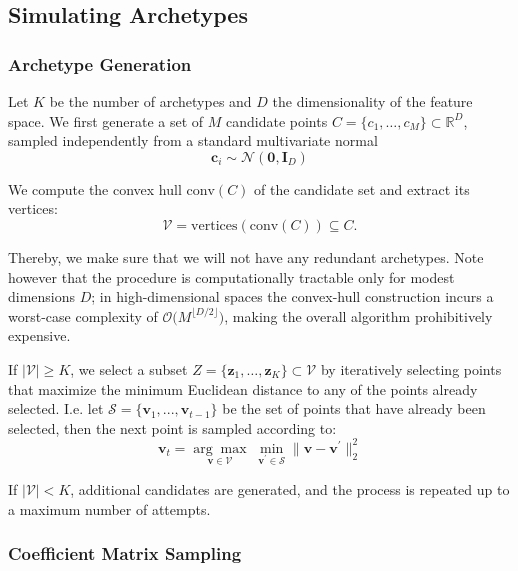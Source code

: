 \documentclass[oneside]{article}
\begin{document}
\subsection{Simulating Archetypes}

\subsubsection{Archetype Generation}

Let $K$ be the number of archetypes and $D$ the dimensionality of the feature space. We first generate a set of $M$ candidate points $C = \{c_1, \dots, c_M\} \subset \mathbb{R}^D$, sampled independently from a standard multivariate normal
\begin{equation}
    \mathbf{c}_i \sim \mathcal{N}(\mathbf{0}, \mathbf{I}_D)
\end{equation}

We compute the convex hull $\mathrm{conv}(C)$ of the candidate set and extract its vertices:
\begin{equation}
    \mathcal{V} = \mathrm{vertices}(\mathrm{conv}(C)) \subseteq C.
\end{equation}

Thereby, we make sure that we will not have any redundant archetypes. Note however that the procedure is computationally tractable only for modest dimensions $D$; in high-dimensional spaces the convex-hull construction incurs a worst-case complexity of $\mathcal{O}\!\bigl(M^{\lfloor D/2\rfloor}\bigr)$, making the overall algorithm prohibitively expensive.

If $|\mathcal{V}| \geq K$, we select a subset $Z = \{\mathbf{z}_1, \dots, \mathbf{z}_K\} \subset \mathcal{V}$ by iteratively selecting points that maximize the minimum Euclidean distance to any of the points already selected. I.e. let $\mathcal{S} = \{\mathbf{v}_1, ..., \mathbf{v}_{t-1}\}$ be the set of points that have already been selected, then the next point is sampled according to:
\begin{equation}
    \mathbf{v}_t = \underset{\mathbf{v} \in \mathcal{V}}{\arg \max} \; \underset{\mathbf{v}^\prime \in \mathcal{S}}{\min} \| \mathbf{v} - \mathbf{v}^\prime \|_2^2
\end{equation}

If $|\mathcal{V}| < K$, additional candidates are generated, and the process is repeated up to a maximum number of attempts.

\subsubsection{Coefficient Matrix Sampling}
\end{document}
